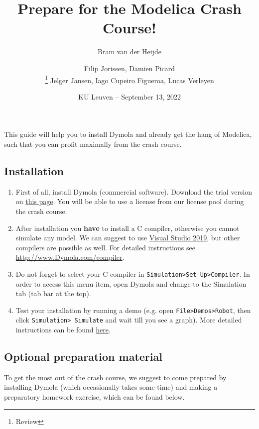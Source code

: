 \documentclass[10pt,a4paper]{article}
\author{Bram van der Heijde}
\begin{document}
	
	\title{Prepare for the Modelica Crash Course!}
	\author{Filip Jorissen, Damien Picard\\ \thanks{Review} Jelger Jansen, Iago Cupeiro Figueroa, Lucas Verleyen} 
	\date{KU Leuven -- September 13, 2022}
	\maketitle

This guide will help you to install Dymola and already get the hang of Modelica, such that you can profit maximally from the crash course. 

\subsection*{Installation}

\begin{enumerate}
	\item First of all, install Dymola (commercial software).  Download the trial version on
	\href{https://www.3ds.com/products-services/catia/products/dymola/trial-version/}{this page}. You will be able to use a license from our license pool during the crash course. 
	\item After installation you \textbf{have} to install a C compiler, otherwise you 
	cannot simulate any model. We can suggest to use \href{https://visualstudio.microsoft.com/fr/vs/older-downloads/}{Visual Studio 2019}, but other compilers are possible as well. For detailed instructions see
	\href{http://www.Dymola.com/compiler}{http://www.Dymola.com/compiler}. 
	\item Do not forget to select your C compiler in \texttt{Simulation>Set Up>Compiler}. In order to access this menu item, open Dymola and change to the Simulation tab (tab bar at the top).
	\item Test your installation by running a demo (e.g. open \texttt{File>Demos>Robot}, then 
	click \texttt{Simulation> Simulate} and wait till you see a graph). More detailed instructions can be found \href{https://www.3ds.com/fileadmin/PRODUCTS/CATIA/DYMOLA/PDF/Installation.pdf}{here}.
\end{enumerate}


\subsection*{Optional preparation material}
To get the most out of the crash course, we suggest to come prepared by installing Dymola (which occasionally takes some time) and making a preparatory homework exercise, which can be found below. 
\end{document}
